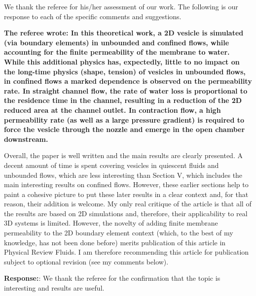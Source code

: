 \documentclass[11pt]{article}
\begin{document}
We thank the referee for his/her assessment of our work.  
The following is
our response to each of the specific comments and suggestions.

{\bf The referee wrote:
In this theoretical work, a 2D vesicle is simulated (via boundary elements) in unbounded and confined flows, while accounting for the finite permeability of the membrane to water. While this additional physics has, expectedly, little to no impact on the long-time physics (shape, tension) of vesicles in unbounded flows, in confined flows a marked dependence is observed on the permeability rate. In straight channel flow, the rate of water loss is proportional to the residence time in the channel, resulting in a reduction of the 2D reduced area at the channel outlet. In contraction flow, a high permeability rate (as well as a large pressure gradient) is required to force the vesicle through the nozzle and emerge in the open chamber downstream.

Overall, the paper is well written and the main results are clearly presented. A decent amount of time is spent covering vesicles in quiescent fluids and unbounded flows, which are less interesting than Section V, which includes the main interesting results on confined flows. However, these earlier sections help to paint a cohesive picture to put these later results in a clear context and, for that reason, their addition is welcome. My only real critique of the article is that all of the results are based on 2D simulations and, therefore, their applicability to real 3D systems is limited. However, the novelty of adding finite membrane permeability to the 2D boundary element context (which, to the best of my knowledge, has not been done before) merits publication of this article in Physical Review Fluids. I am therefore recommending this article for publication subject to optional revision (see my comments below).}


\noindent
{\bf Response:}: We thank the referee for the confirmation that the topic is interesting and results are useful.
\end{document}
